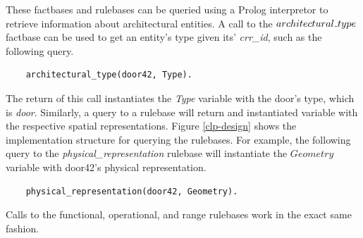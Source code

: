 \documentclass[12pt]{ucthesis}
\begin{document}
These factbases and rulebases can be queried using a Prolog interpretor to retrieve information about architectural entities. A call to the $architectural \mathunderscore type$ factbase can be used to get an entity's type given its' \emph{crr\_id}, such as the following query.
\begin{verbatim}
    architectural_type(door42, Type).
\end{verbatim} The return of this call instantiates the \emph{Type} variable with the door's type, which is \emph{door}. Similarly, a query to a rulebase will return and instantiated variable with the respective spatial representations. Figure \ref{clp-design} shows the implementation structure for querying the rulebases. For example, the following query to the \emph{physical\_representation} rulebase will instantiate the $Geometry$ variable with door42's physical representation. \begin{verbatim}
    physical_representation(door42, Geometry).
\end{verbatim} Calls to the functional, operational, and range rulebases work in the exact same fashion.






\end{document}
